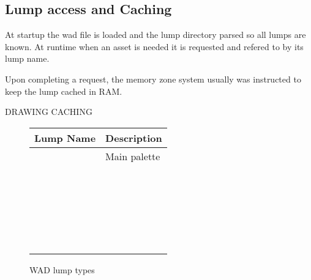 \subsection{Lump access and Caching}
At startup the wad file is loaded and the lump directory parsed so all lumps are known. At runtime when an asset is needed it is requested and refered to by its lump name.\\
\par
{}
\par
 Upon completing a request, the memory zone system usually was instructed to keep the lump cached in RAM.\\
\par
DRAWING CACHING\\
\par
\begin{figure}[H]
\centering  
\begin{tabularx}{\textwidth}{ L{0.2}  L{0.8}}
  \toprule
  \textbf{Lump Name} &  \textbf{Description} \\
   
  \toprule 
   & Main palette \\
   &  \\
   &  \\
  \toprule
   &  \\
   &  \\
   &  \\
   &  \\
   &  \\
   &  \\
   &  \\
   &  \\
   &  \\
   &  \\
   &  \\
  \toprule
   &  \\
   &  \\
   &  \\
  \toprule
   &  \\
   &  \\
   &  \\
   &  \\
   &  \\  
   &  \\  
   &  \\  
   &  \\  
   \toprule
\end{tabularx}
\caption{WAD lump types}
\end{figure}
\par


